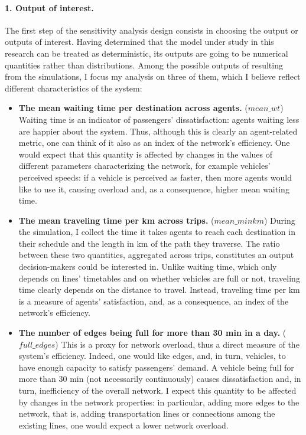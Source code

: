 \paragraph{1. Output of interest.}
The first step of the sensitivity analysis design consists in choosing the output or outputs of interest. Having determined that the model under study in this research can be treated as deterministic, its outputs are going to be numerical quantities rather than distributions. Among the possible outputs of resulting from the simulations, I focus my analysis on three of them, which I believe reflect different characteristics of the system:
\begin{itemize}
    \item \textbf{The mean waiting time per destination across agents.} ($mean\_wt$) Waiting time is an indicator of passengers' dissatisfaction: agents waiting less are happier about the system. Thus, although this is clearly an agent-related metric, one can think of it also as an index of the network's efficiency. One would expect that this quantity is affected by changes in the values of different parameters characterizing the network, for example vehicles' perceived speeds: if a vehicle is perceived as faster, then more agents would like to use it, causing overload and, as a consequence, higher mean waiting time. 
    \item \textbf{The mean traveling time per km across trips.} ($mean\_minkm$) During the simulation, I collect the time it takes agents to reach each destination in their schedule and the length in km of the path they traverse. The ratio between these two quantities, aggregated across trips, constitutes an output decision-makers could be interested in. Unlike waiting time, which only depends on lines' timetables and on whether vehicles are full or not, traveling time clearly depends on the distance to travel. Instead, traveling time per km is a measure of agents' satisfaction, and, as a consequence, an index of the network's efficiency.
    \item \textbf{The number of edges being full for more than 30 min in a day.} ($full\_edges$) This is a proxy for network overload, thus a direct measure of the system's efficiency. Indeed, one would like edges, and, in turn, vehicles, to have enough capacity to satisfy passengers' demand. A vehicle being full for more than 30 min (not necessarily continuously) causes dissatisfaction and, in turn, inefficiency of the overall network. I expect this quantity to be affected by changes in the network properties: in particular, adding more edges to the network, that is, adding transportation lines or connections among the existing lines, one would expect a lower network overload.
\end{itemize}
